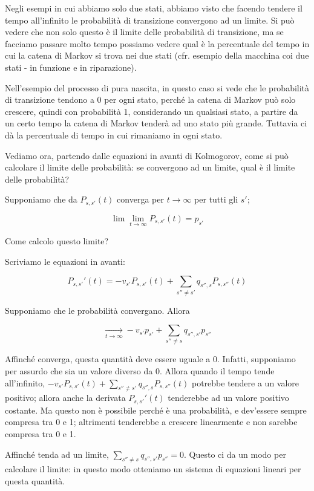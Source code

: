 \documentclass[a4paper,12pt]{book}
\begin{document}
Negli esempi in cui abbiamo solo due stati, abbiamo visto che facendo tendere il tempo all'infinito le probabilità di transizione convergono ad un limite. Si può vedere che non solo questo è il limite delle probabilità di transizione, ma se facciamo passare molto tempo possiamo vedere qual è la percentuale del tempo in cui la catena di Markov si trova nei due stati (cfr. esempio della macchina coi due stati - in funzione e in riparazione). 

Nell'esempio del processo di pura nascita, in questo caso si vede che le probabilità di transizione tendono a 0 per ogni stato, perché la catena di Markov può solo crescere, quindi con probabilità 1, considerando un qualsiasi stato, a partire da un certo tempo la catena di Markov tenderà ad uno stato più grande. Tuttavia ci dà la percentuale di tempo in cui rimaniamo in ogni stato. 

Vediamo ora, partendo dalle equazioni in avanti di Kolmogorov, come si può calcolare il limite delle probabilità: se convergono ad un limite, qual è il limite delle probabilità? 

Supponiamo che da $ P_{s,s'}(t) $ converga per $ t \to \infty $ per tutti gli $ s' $; 

$$ \lim\lim\limits_{t \to \infty} P_{s,s'}(t) = p_{s'} $$ 

Come calcolo questo limite?

Scriviamo le equazioni in avanti:

$$ P_{s,s'}'(t) = -v_{s'} P_{s,s'}(t) + \sum_{s'' \ne s'}q_{s'',s} P_{s,s''}(t) $$

Supponiamo che le probabilità convergano. Allora 

$$ \underset{t \to \infty}{\longrightarrow} -v_{s'}p_{s'} + \sum_{s'' \ne s} q_{s'',s'}p_{s''} $$

Affinché converga, questa quantità deve essere uguale a 0. Infatti, supponiamo per assurdo che sia un valore diverso da 0. Allora quando il tempo tende all'infinito, $ -v_{s'} P_{s,s'}(t) + \sum_{s'' \ne s'}q_{s'',s} P_{s,s''}(t) $ potrebbe tendere a un valore positivo; allora anche la derivata $ P_{s,s'}'(t) $ tenderebbe ad un valore positivo costante. Ma questo non è possibile perché è una probabilità, e dev'essere sempre compresa tra 0 e 1; altrimenti tenderebbe a crescere linearmente e non sarebbe compresa tra 0 e 1. 

Affinché tenda ad un limite, $ \sum_{s'' \ne s} q_{s'',s'}p_{s''} = 0 $. Questo ci da un modo per calcolare il limite: in questo modo otteniamo un sistema di equazioni lineari per questa quantità. 
\end{document}
